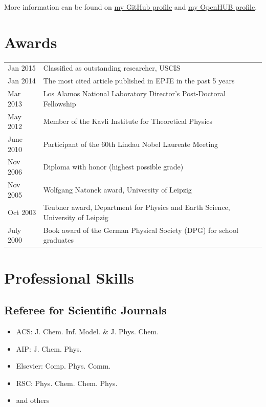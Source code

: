\documentclass{article}
\begin{document}
More information can be found on \href{http://www.github.com/junghans}{my GitHub profile} and \href{http://www.openhub.net/accounts/junghans}{my OpenHUB profile}.

\section*{Awards}
\begin{tabular}{ll}
Jan 2015 & Classified as outstanding researcher, USCIS \\
Jan 2014 & The most cited article published in EPJE in the past 5 years \\
Mar 2013 & Los Alamos National Laboratory Director's Post-Doctoral Fellowship \\
May 2012 & Member of the Kavli Institute for Theoretical Physics\\
June 2010 & Participant of the 60th Lindau Nobel Laureate Meeting\\
Nov 2006 & Diploma with honor (highest possible grade) \\
Nov 2005  & Wolfgang Natonek award, University of Leipzig\\
Oct 2003  & Teubner award, Department for Physics and Earth Science, University of Leipzig\\
July 2000 & Book award of the German Physical Society (DPG) for school graduates\\
\end{tabular}

\section*{Professional Skills}

\subsection*{Referee for Scientific Journals}

\begin{itemize}
\setlength{\itemsep}{0pt}
\setlength{\parskip}{0pt}
\setlength{\parsep}{0pt}
\item ACS: J. Chem. Inf. Model. \& J. Phys. Chem.
\item AIP: J. Chem. Phys.
\item Elsevier: Comp. Phys. Comm.
\item RSC: Phys. Chem. Chem. Phys.
\item and others
\end{itemize}
\end{document}
